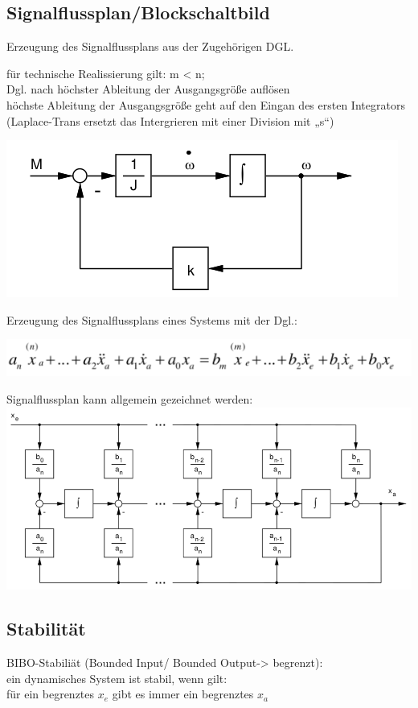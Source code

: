 \documentclass[10pt,a4paper]{article}
\begin{document}
\subsection{Signalflussplan/Blockschaltbild}
    Erzeugung des Signalflussplans aus der Zugehörigen DGL.
    \begin{mdframed}[style=exercise]
        \begin{enumerate}
                für technische Realissierung gilt: m < n;\\
                Dgl. nach höchster Ableitung der Ausgangsgröße auflösen\\
                höchste Ableitung der Ausgangsgröße geht auf den Eingan des ersten Integrators\\
                (Laplace-Trans ersetzt das Intergrieren mit einer Division mit „s“)\\
        \end{enumerate}
    \end{mdframed}
    \begin{center}
            \includegraphics[width=.30\textwidth]{Figures/Signalflussplan12.png}
        \end{center}
        Erzeugung des Signalflussplans eines Systems mit der Dgl.:
        \begin{center}
                \includegraphics[width=.45\textwidth]{Figures/DGLSF.png}
        \end{center}
                Signalflussplan kann allgemein gezeichnet werden:\\
        \includegraphics[width=.5\textwidth]{Figures/SFmitDGL.png}
\subsection{Stabilität}
    \begin{mdframed}[style=exercise]
    BIBO-Stabiliät (Bounded Input/ Bounded Output-> begrenzt):\\
    ein dynamisches System ist stabil, wenn gilt:\\
    für ein begrenztes $x_e$ gibt es immer ein begrenztes $x_a$
\end{mdframed}
\end{document}
